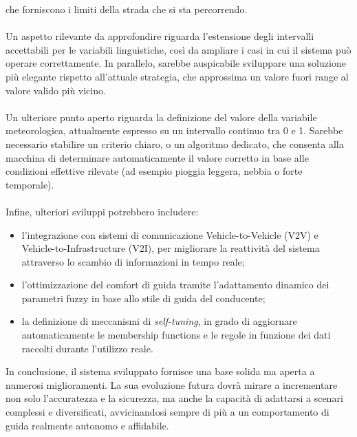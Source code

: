 che forniscono i limiti della strada che si sta percorrendo.
\\\\
\noindent Un aspetto rilevante da approfondire riguarda l'estensione degli intervalli accettabili per le variabili linguistiche, 
così da ampliare i casi in cui il sistema può operare correttamente.  
In parallelo, sarebbe auspicabile sviluppare una soluzione più elegante rispetto all'attuale strategia, 
che approssima un valore fuori range al valore valido più vicino.
\\\\
\noindent Un ulteriore punto aperto riguarda la definizione del valore della variabile meteorologica, 
attualmente espresso su un intervallo continuo tra 0 e 1.  
Sarebbe necessario stabilire un criterio chiaro, o un algoritmo dedicato, che consenta alla macchina di 
determinare automaticamente il valore corretto in base alle condizioni effettive rilevate 
(ad esempio pioggia leggera, nebbia o forte temporale).
\\\\
\noindent Infine, ulteriori sviluppi potrebbero includere:
\begin{itemize}
    \item l'integrazione con sistemi di comunicazione Vehicle-to-Vehicle (V2V) e Vehicle-to-Infrastructure (V2I), 
    per migliorare la reattività del sistema attraverso lo scambio di informazioni in tempo reale;
    \item l'ottimizzazione del comfort di guida tramite l'adattamento dinamico dei parametri fuzzy 
    in base allo stile di guida del conducente;
    \item la definizione di meccanismi di \textit{self-tuning}, in grado di aggiornare automaticamente 
    le membership functions e le regole in funzione dei dati raccolti durante l'utilizzo reale.
\end{itemize}

\noindent In conclusione, il sistema sviluppato fornisce una base solida ma aperta a numerosi miglioramenti.  
La sua evoluzione futura dovrà mirare a incrementare non solo l'accuratezza e la sicurezza, 
ma anche la capacità di adattarsi a scenari complessi e diversificati, avvicinandosi sempre di più 
a un comportamento di guida realmente autonomo e affidabile.  
